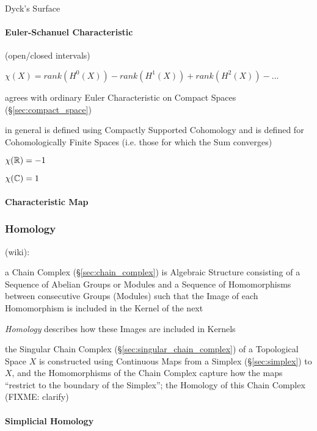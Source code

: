 Dyck's Surface



\paragraph{Euler-Schanuel Characteristic}\label{sec:euler_schanuel}\hfill

(open/closed intervals) %

$\chi(X) = rank (H^0(X)) - rank (H^1(X)) + rank (H^2(X)) - \ldots$

agrees with ordinary Euler Characteristic on Compact Spaces
(\S\ref{sec:compact_space})

in general is defined using Compactly Supported Cohomology and is
defined for Cohomologically Finite Spaces (i.e. those for which the
Sum converges) %

$\chi(\mathbb{R}) = -1$

$\chi(\mathbb{C}) = 1$



\paragraph{Characteristic Map}\label{sec:characteristic_map}\hfill




\subsubsection{Homology}\label{sec:homology}

(wiki):

a Chain Complex (\S\ref{sec:chain_complex}) is Algebraic Structure consisting
of a Sequence of Abelian Groups or Modules and a Sequence of Homomorphisms
between consecutive Groups (Modules) such that the Image of each Homomorphism
is included in the Kernel of the next

\emph{Homology} describes how these Images are included in Kernels

the Singular Chain Complex (\S\ref{sec:singular_chain_complex}) of a
Topological Space $X$ is constructed using Continuous Maps from a Simplex
(\S\ref{sec:simplex}) to $X$, and the Homomorphisms of the Chain Complex
capture how the maps ``restrict to the boundary of the Simplex''; the Homology
of this Chain Complex (FIXME: clarify)



\paragraph{Simplicial Homology}\label{sec:simplicial_homology}\hfill

